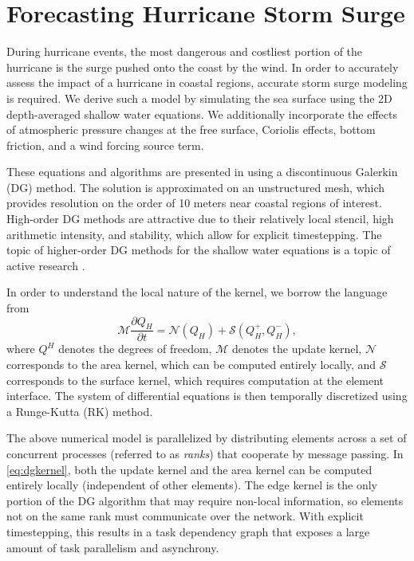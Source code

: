 \section{Forecasting Hurricane Storm Surge}
\label{sec:dgswem}

During hurricane events, the most dangerous and costliest portion of the hurricane is the surge pushed onto the coast by the wind. In order to accurately assess the impact of a hurricane in coastal regions, accurate storm surge modeling is required.  We derive such a model by simulating the sea surface using the 2D depth-averaged shallow water equations. 
We additionally incorporate the effects of atmospheric pressure changes at the free surface, Coriolis effects, bottom friction, and a wind forcing source term.

These equations and algorithms are presented in \cite{dawsonhurr} using a discontinuous Galerkin (DG) method. The solution is approximated on an unstructured mesh, which provides resolution on the order of 10 meters near coastal regions of interest.
High-order DG methods are attractive due to their relatively local stencil, high arithmetic intensity, and stability, which allow for explicit timestepping. The topic of higher-order DG methods for the shallow water equations is a topic of active research \cite{warb,brus,giraldo,Brus2017}.

In order to understand the local nature of the kernel, we borrow the language from \cite{warb}
\begin{equation}
\mathcal{M} \frac{\partial Q_H}{ \partial t} = \mathcal{N}(Q_H) + \mathcal{S}(Q_H^{+},Q_H^{-}),
\label{eq:dgkernel}
\end{equation}
where $Q^H$ denotes the degrees of freedom, $\mathcal{M}$ denotes the update kernel, $\mathcal{N}$ corresponds to the area kernel, which can be computed entirely locally, and $\mathcal{S}$ corresponds to the surface kernel, which requires computation at the element interface. The system of differential equations is then temporally discretized using a Runge-Kutta (RK) method.

The above numerical model is parallelized by distributing elements across a set of concurrent processes (referred to as {\em ranks}) that cooperate by message passing.
In \eqref{eq:dgkernel}, both the update kernel and the area kernel can be computed entirely locally (independent of other elements).
The edge kernel is the only portion of the DG algorithm that may require non-local information, so elements not on the same rank must communicate over the network.
With explicit timestepping, this results in a task dependency graph that exposes a large amount of task parallelism and asynchrony.


